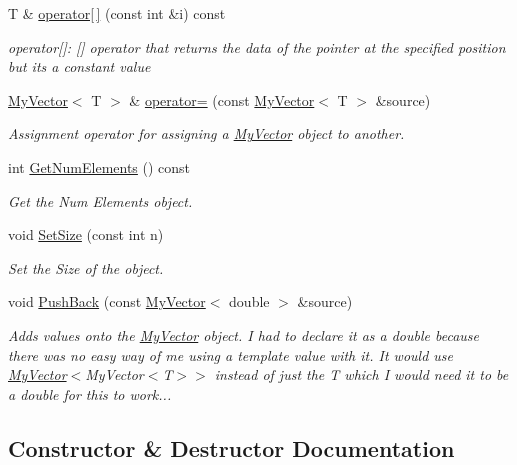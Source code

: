 \begin{DoxyCompactItemize}
T \& \mbox{\hyperlink{class_my_vector_a01d48c27ba17ad15aa29b2f039c303cd}{operator\mbox{[}$\,$\mbox{]}}} (const int \&i) const
\begin{DoxyCompactList}\small\item\em operator\mbox{[}\mbox{]}\+: \mbox{[}\mbox{]} operator that returns the data of the pointer at the specified position but it\textquotesingle{}s a constant value \end{DoxyCompactList}\item 
\mbox{\hyperlink{class_my_vector}{My\+Vector}}$<$ T $>$ \& \mbox{\hyperlink{class_my_vector_a459ecae4c3fc3836415467db79bd0af2}{operator=}} (const \mbox{\hyperlink{class_my_vector}{My\+Vector}}$<$ T $>$ \&source)
\begin{DoxyCompactList}\small\item\em Assignment operator for assigning a \mbox{\hyperlink{class_my_vector}{My\+Vector}} object to another. \end{DoxyCompactList}\item 
int \mbox{\hyperlink{class_my_vector_a5806423f48877c084cc436ecdffa756c}{Get\+Num\+Elements}} () const
\begin{DoxyCompactList}\small\item\em Get the Num Elements object. \end{DoxyCompactList}\item 
void \mbox{\hyperlink{class_my_vector_a54da580455b3348ddc47a6359e9db444}{Set\+Size}} (const int n)
\begin{DoxyCompactList}\small\item\em Set the Size of the object. \end{DoxyCompactList}\item 
void \mbox{\hyperlink{class_my_vector_a1070a35184f1a8223a7df7f4fdd78492}{Push\+Back}} (const \mbox{\hyperlink{class_my_vector}{My\+Vector}}$<$ double $>$ \&source)
\begin{DoxyCompactList}\small\item\em Adds values onto the \mbox{\hyperlink{class_my_vector}{My\+Vector}} object. I had to declare it as a double because there was no easy way of me using a template value with it. It would use \mbox{\hyperlink{class_my_vector}{My\+Vector}}$<$My\+Vector$<$\+T$>$$>$ instead of just the T which I would need it to be a double for this to work... \end{DoxyCompactList}\end{DoxyCompactItemize}


\subsection{Constructor \& Destructor Documentation}
\mbox{\label{class_my_vector_ac356762c5ced52c0d934476cef32e472}} 
